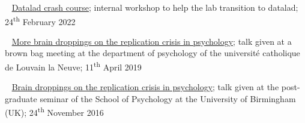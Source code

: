 




\textbullet~ \href{https://cpp-lln-lab.github.io/datalad_crash_course/}
{Datalad crash course};
internal workshop to help the lab transition to datalad;
24\textsuperscript{th} February 2022

\textbullet~ \href{https://osf.io/vu327/}
{More brain droppings on the replication crisis in psychology};
talk given at a brown bag meeting at the department of psychology
of the université catholique de Louvain la Neuve;
11\textsuperscript{th} April 2019

\textbullet~ \href{https://dx.doi.org/10.6084/m9.figshare.4257992.v1}
{Brain droppings on the replication crisis in psychology};
talk given at the post-graduate seminar of the School of Psychology
at the University of Birmingham (UK);
24\textsuperscript{th} November 2016
